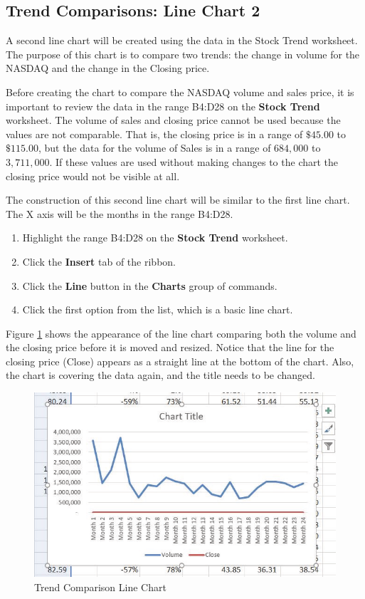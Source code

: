 \subsection{Trend Comparisons: Line Chart 2}

A second line chart will be created using the data in the Stock Trend worksheet. The purpose of this chart is to compare two trends: the change in volume for the NASDAQ and the change in the Closing price.

Before creating the chart to compare the NASDAQ volume and sales price, it is important to review the data in the range \textsf{B4:D28} on the \textbf{Stock Trend} worksheet. The volume of sales and closing price cannot be used because the values are not comparable. That is, the closing price is in a range of $ \$45.00 $ to $ \$115.00 $, but the data for the volume of Sales is in a range of $ 684,000 $ to $ 3,711,000 $. If these values are used without making changes to the chart the closing price would not be visible at all.

The construction of this second line chart will be similar to the first line chart. The X axis will be the months in the range \textsf{B4:D28}.

\begin{enumerate}
	\item Highlight the range \textsf{B4:D28} on the \textbf{Stock Trend} worksheet.
	\item Click the \textbf{Insert} tab of the ribbon.
	\item Click the \textbf{Line} button in the \textbf{Charts} group of commands.
	\item Click the first option from the list, which is a basic line chart.
\end{enumerate}

Figure \ref{04:fig07} shows the appearance of the line chart comparing both the volume and the closing price before it is moved and resized. Notice that the line for the closing price (Close) appears as a straight line at the bottom of the chart. Also, the chart is covering the data again, and the title needs to be changed.

\begin{figure}[H]
	\centering
	\includegraphics[width=\maxwidth{.95\linewidth}]{gfx/ch04_fig07}
	\caption{Trend Comparison Line Chart}
	\label{04:fig07}
\end{figure}

